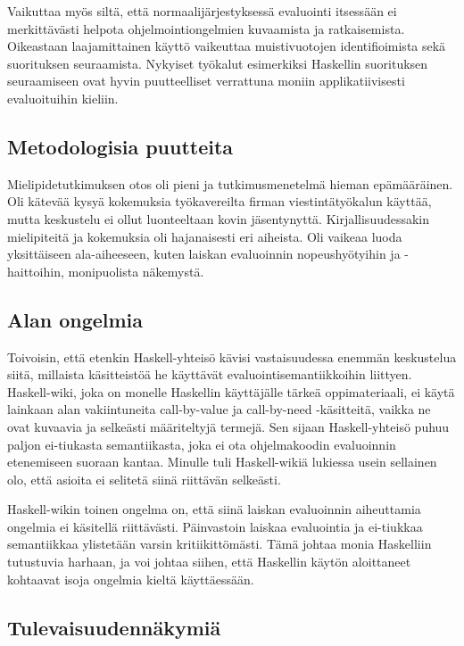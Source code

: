 Vaikuttaa myös siltä, että normaalijärjestyksessä evaluointi itsessään ei merkittävästi helpota ohjelmointiongelmien kuvaamista ja ratkaisemista. Oikeastaan laajamittainen käyttö vaikeuttaa muistivuotojen identifioimista sekä suorituksen seuraamista. Nykyiset työkalut esimerkiksi Haskellin suorituksen seuraamiseen ovat hyvin puutteelliset verrattuna moniin applikatiivisesti evaluoituihin kieliin.

\subsection{Metodologisia puutteita}

Mielipidetutkimuksen otos oli pieni ja tutkimusmenetelmä hieman epämääräinen. Oli kätevää kysyä kokemuksia työkavereilta firman viestintätyökalun käyttää, mutta keskustelu ei ollut luonteeltaan kovin jäsentynyttä. Kirjallisuudessakin mielipiteitä ja kokemuksia oli hajanaisesti eri aiheista. Oli vaikeaa luoda yksittäiseen ala-aiheeseen, kuten laiskan evaluoinnin nopeushyötyihin ja -haittoihin, monipuolista näkemystä.

\subsection{Alan ongelmia}

Toivoisin, että etenkin Haskell-yhteisö kävisi vastaisuudessa enemmän keskustelua siitä, millaista käsitteistöä he käyttävät evaluointisemantiikkoihin liittyen. Haskell-wiki, joka on monelle Haskellin käyttäjälle tärkeä oppimateriaali, ei käytä lainkaan alan vakiintuneita call-by-value ja call-by-need -käsitteitä, vaikka ne ovat kuvaavia ja selkeästi määriteltyjä termejä. Sen sijaan Haskell-yhteisö puhuu paljon ei-tiukasta semantiikasta, joka ei ota ohjelmakoodin evaluoinnin etenemiseen suoraan kantaa. Minulle tuli Haskell-wikiä lukiessa usein sellainen olo, että asioita ei selitetä siinä riittävän selkeästi.

Haskell-wikin toinen ongelma on, että siinä laiskan evaluoinnin aiheuttamia ongelmia ei käsitellä riittävästi. Päinvastoin laiskaa evaluointia ja ei-tiukkaa semantiikkaa ylistetään varsin kritiikittömästi. Tämä johtaa monia Haskelliin tutustuvia harhaan, ja voi johtaa siihen, että Haskellin käytön aloittaneet kohtaavat isoja ongelmia kieltä käyttäessään.

\subsection{Tulevaisuudennäkymiä}

